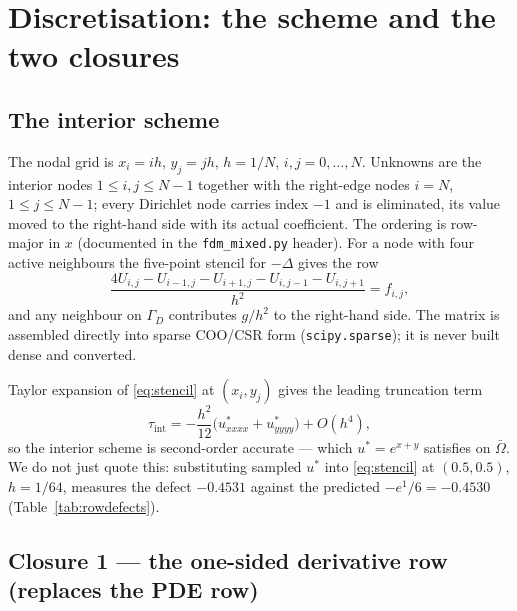 \documentclass[11pt,a4paper]{article}
\begin{document}
\section{Discretisation: the scheme and the two closures}
\label{sec:disc}

\subsection{The interior scheme}

The nodal grid is $x_i = ih$, $y_j = jh$, $h = 1/N$, $i,j = 0,\dots,N$.
Unknowns are the interior nodes $1 \le i,j \le N-1$ together with the
right-edge nodes $i = N$, $1 \le j \le N-1$; every Dirichlet node carries
index $-1$ and is eliminated, its value moved to the right-hand side with its
actual coefficient. The ordering is row-major in $x$ (documented in the
\texttt{fdm\_mixed.py} header). For a node with four active neighbours the
five-point stencil for $-\Delta$ gives the row
\begin{equation}\label{eq:stencil}
\frac{4U_{i,j} - U_{i-1,j} - U_{i+1,j} - U_{i,j-1} - U_{i,j+1}}{h^2}
= f_{i,j},
\end{equation}
and any neighbour on $\Gamma_D$ contributes $g/h^2$ to the right-hand side.
The matrix is assembled directly into sparse COO/CSR form
(\texttt{scipy.sparse}); it is never built dense and converted.

Taylor expansion of \eqref{eq:stencil} at $(x_i,y_j)$ gives the leading
truncation term
\begin{equation}\label{eq:trunc}
\tau_{\mathrm{int}} = -\frac{h^2}{12}\big(u^*_{xxxx}+u^*_{yyyy}\big) + O(h^4),
\end{equation}
so the interior scheme is second-order accurate --- which $u^*=e^{x+y}$
satisfies on $\bar\Omega$. We do not just quote this: substituting sampled
$u^*$ into \eqref{eq:stencil} at $(0.5,0.5)$, $h=1/64$, measures the defect
$-0.4531$ against the predicted $-e^1/6 = -0.4530$
(Table~\ref{tab:rowdefects}).

\subsection{Closure 1 --- the one-sided derivative row (replaces the PDE row)}
\label{sec:onesided}
\end{document}
